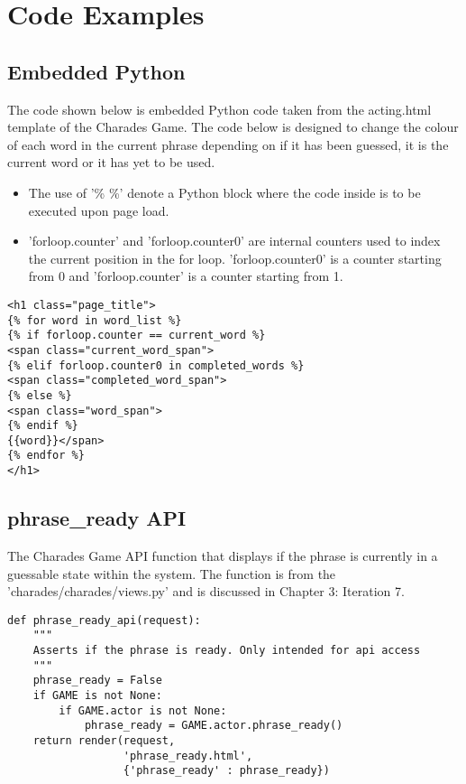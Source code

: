\chapter{Code Examples}

\section{Embedded Python}

The code shown below is embedded Python code taken from the acting.html template of the Charades Game. The code below is designed to change the colour of each word in the current phrase depending on if it has been guessed, it is the current word or it has yet to be used.

\begin{itemize}
	\item The use of '{\% \%}' denote a Python block where the code inside is to be executed upon page load. 
	
	\item 'forloop.counter' and 'forloop.counter0' are internal counters used to index the current position in the for loop. 'forloop.counter0' is a counter starting from 0 and 'forloop.counter' is a counter starting from 1.

\end{itemize}

\begin{verbatim}
<h1 class="page_title">
{% for word in word_list %}
{% if forloop.counter == current_word %}
<span class="current_word_span">
{% elif forloop.counter0 in completed_words %}
<span class="completed_word_span">
{% else %}
<span class="word_span">
{% endif %}
{{word}}</span>
{% endfor %}
</h1>
\end{verbatim}

\section{phrase\_ready API}

The Charades Game API function that displays if the phrase is currently in a guessable state within the system. The function is from the 'charades/charades/views.py' and is discussed in Chapter 3: Iteration 7.

\begin{verbatim}
def phrase_ready_api(request):
    """
    Asserts if the phrase is ready. Only intended for api access
    """
    phrase_ready = False
    if GAME is not None:
        if GAME.actor is not None:
            phrase_ready = GAME.actor.phrase_ready()
    return render(request,
    		      'phrase_ready.html',
    		      {'phrase_ready' : phrase_ready})
\end{verbatim}


